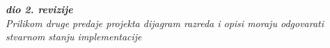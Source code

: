 			\textbf{\textit{dio 2. revizije}}\\			
			
			\textit{Prilikom druge predaje projekta dijagram razreda i opisi moraju odgovarati stvarnom stanju implementacije}
			
			
			
			\eject
		
%			
%			
%			
%			
%			
%		
%			
%			
%			
%		
%		
